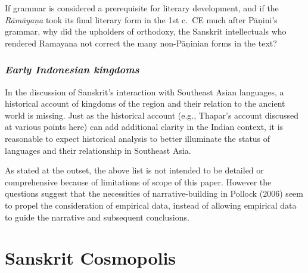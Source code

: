 If grammar is considered a prerequisite for literary development, and if the {\sl Rāmāyaṇa} took its final literary form in the 1st c.\ CE much after Pāṇini’s grammar, why did the upholders of orthodoxy, the Sanskrit intellectuals who rendered Ramayana not correct the many non-Pāṇinian forms in the text? 

\subsubsection{{\sl Early Indonesian kingdoms}}

In the discussion of Sanskrit’s interaction with Southeast Asian languages, a historical account of kingdoms of the region and their relation to the ancient world is missing. Just as the historical account (e.g., Thapar’s account discussed at various points here) can add additional clarity in the Indian context, it is reasonable to expect historical analysis to better illuminate the status of languages and their relationship in Southeast Asia. 

As stated at the outset, the above list is not intended to be detailed or comprehensive because of limitations of scope of this paper. However the questions suggest that the necessities of narrative-building in Pollock (2006) seem to propel the consideration of empirical data, instead of allowing empirical data to guide the narrative and subsequent conclusions. 

\section{Sanskrit Cosmopolis}

